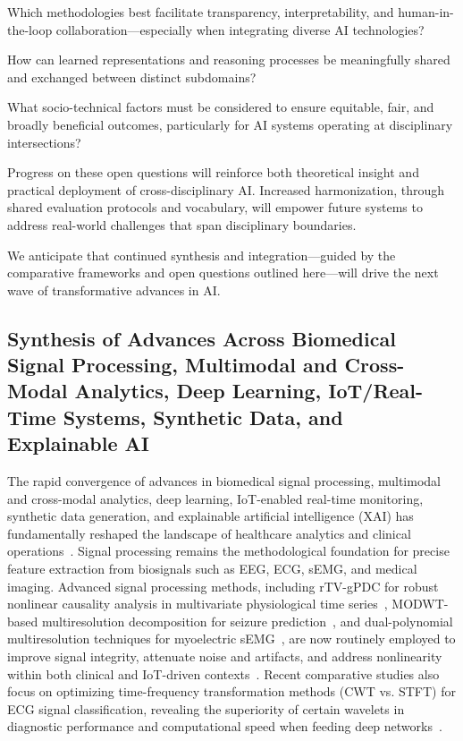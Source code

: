 \documentclass[sigconf]{acmart}
\begin{document}
Which methodologies best facilitate transparency, interpretability, and human-in-the-loop collaboration—especially when integrating diverse AI technologies?

How can learned representations and reasoning processes be meaningfully shared and exchanged between distinct subdomains?

What socio-technical factors must be considered to ensure equitable, fair, and broadly beneficial outcomes, particularly for AI systems operating at disciplinary intersections?

Progress on these open questions will reinforce both theoretical insight and practical deployment of cross-disciplinary AI. Increased harmonization, through shared evaluation protocols and vocabulary, will empower future systems to address real-world challenges that span disciplinary boundaries.

We anticipate that continued synthesis and integration—guided by the comparative frameworks and open questions outlined here—will drive the next wave of transformative advances in AI.

\subsection{Synthesis of Advances Across Biomedical Signal Processing, Multimodal and Cross-Modal Analytics, Deep Learning, IoT/Real-Time Systems, Synthetic Data, and Explainable AI}

The rapid convergence of advances in biomedical signal processing, multimodal and cross-modal analytics, deep learning, IoT-enabled real-time monitoring, synthetic data generation, and explainable artificial intelligence (XAI) has fundamentally reshaped the landscape of healthcare analytics and clinical operations~\cite{ref16,ref17,ref18,ref19,ref20,ref21,ref22,ref23,ref24,ref25,ref28,ref29,ref30,ref31,ref32,ref33,ref34,ref35,ref36,ref37,ref38,ref39,ref40,ref41,ref42,ref43,ref44,ref45,ref46,ref47,ref48,ref49,ref50,ref51,ref52,ref53,ref54,ref55,ref56,ref57,ref58,ref59,ref60,ref61,ref62,ref63,ref64,ref65,ref66,ref67,ref68,ref69,ref70,ref71,ref72,ref73,ref74,ref75,ref76,ref77,ref78,ref79,ref80,ref81,ref82,ref83,ref84,ref85,ref86,ref87,ref88,ref89,ref90,ref91,ref92,ref94,ref95,ref96,ref97,ref98,ref99,ref100,ref101,ref102,ref103,ref104,ref105,ref106,ref107}. Signal processing remains the methodological foundation for precise feature extraction from biosignals such as EEG, ECG, sEMG, and medical imaging. Advanced signal processing methods, including rTV-gPDC for robust nonlinear causality analysis in multivariate physiological time series~\cite{ref95}, MODWT-based multiresolution decomposition for seizure prediction~\cite{ref102}, and dual-polynomial multiresolution techniques for myoelectric sEMG~\cite{ref97}, are now routinely employed to improve signal integrity, attenuate noise and artifacts, and address nonlinearity within both clinical and IoT-driven contexts~\cite{ref16,ref17,ref19,ref95,ref97,ref102}. Recent comparative studies also focus on optimizing time-frequency transformation methods (CWT vs. STFT) for ECG signal classification, revealing the superiority of certain wavelets in diagnostic performance and computational speed when feeding deep networks~\cite{ref101}.
\end{document}
